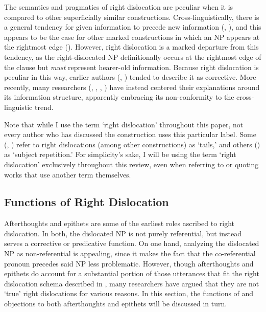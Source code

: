 \documentclass[titlepage,12pt]{article}
\begin{document}
The semantics and pragmatics of right dislocation are peculiar when it is compared to other superficially similar constructions. Cross-linguistically, there is a general tendency for given information to precede new information (\citealt{haviland_clark_1974}, \citealt{tomlin_basic_1986}), and this appears to be the case for other marked constructions in which an NP appears at the rightmost edge (\citealt{ward_discourse_1996}). However, right dislocation is a marked departure from this tendency, as the right-dislocated NP definitionally occurs at the rightmost edge of the clause but \emph{must} represent hearer-old information. Because right dislocation is peculiar in this way, earlier authors (\citealt{tomlin_basic_1986}, \citealt{geluykens_tails_1987}) tended to describe it as corrective. More recently, many researchers (\citealt{ziv_right_1994}, \citealt{ziv_left_1994}, \citealt{grosz_centering_1998}, \citealt{lambrecht_information_2000}) have instead centered their explanations around its information structure, apparently embracing its non-conformity to the cross-linguistic trend. 

Note that while I use the term `right dislocation' throughout this paper, not every author who has discussed the construction uses this particular label. Some (\citealt{geluykens_tails_1987}, \citealt{aijmer_themes_1989}) refer to right dislocations (among other constructions) as `tails,' and others (\citealt{visser_historical_1963}) as `subject repetition.' For simplicity's sake, I will be using the term `right dislocation' exclusively throughout this review, even when referring to or quoting works that use another term themselves.

\subsection{Functions of Right Dislocation} \label{aftep}

Afterthoughts and epithets are some of the earliest roles ascribed to right dislocation. In both, the dislocated NP is not purely referential, but instead serves a corrective or predicative function. On one hand, analyzing the dislocated NP as non-referential is appealing, since it makes the fact that the co-referential pronoun precedes said NP less problematic. However, though afterthoughts and epithets do account for a substantial portion of those utterances that fit the right dislocation schema described in \citealt{grosz_centering_1998}, many researchers have argued that they are not `true' right dislocations for various reasons. In this section, the functions of and objections to both afterthoughts and epithets will be discussed in turn.
\end{document}
